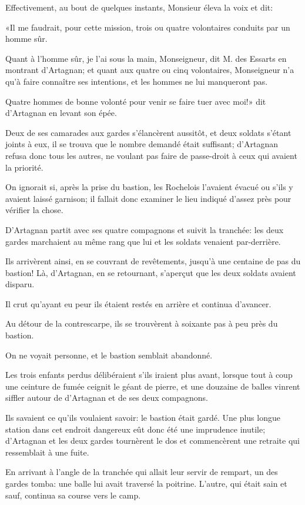 Effectivement, au bout de quelques instants, Monsieur éleva la voix et dit: 

«Il me faudrait, pour cette mission, trois ou quatre volontaires conduits par un homme sûr. 

\speak  Quant à l'homme sûr, je l'ai sous la main, Monseigneur, dit M. des Essarts en montrant d'Artagnan; et quant aux quatre ou cinq volontaires, Monseigneur n'a qu'à faire connaître ses intentions, et les hommes ne lui manqueront pas. 

\speak  Quatre hommes de bonne volonté pour venir se faire tuer avec moi!» dit d'Artagnan en levant son épée. 

Deux de ses camarades aux gardes s'élancèrent aussitôt, et deux soldats s'étant joints à eux, il se trouva que le nombre demandé était suffisant; d'Artagnan refusa donc tous les autres, ne voulant pas faire de passe-droit à ceux qui avaient la priorité. 

On ignorait si, après la prise du bastion, les Rochelois l'avaient évacué ou s'ils y avaient laissé garnison; il fallait donc examiner le lieu indiqué d'assez près pour vérifier la chose. 

D'Artagnan partit avec ses quatre compagnons et suivit la tranchée: les deux gardes marchaient au même rang que lui et les soldats venaient par-derrière. 

Ils arrivèrent ainsi, en se couvrant de revêtements, jusqu'à une centaine de pas du bastion! Là, d'Artagnan, en se retournant, s'aperçut que les deux soldats avaient disparu. 

Il crut qu'ayant eu peur ils étaient restés en arrière et continua d'avancer. 

Au détour de la contrescarpe, ils se trouvèrent à soixante pas à peu près du bastion. 

On ne voyait personne, et le bastion semblait abandonné. 

Les trois enfants perdus délibéraient s'ils iraient plus avant, lorsque tout à coup une ceinture de fumée ceignit le géant de pierre, et une douzaine de balles vinrent siffler autour de d'Artagnan et de ses deux compagnons. 

Ils savaient ce qu'ils voulaient savoir: le bastion était gardé. Une plus longue station dans cet endroit dangereux eût donc été une imprudence inutile; d'Artagnan et les deux gardes tournèrent le dos et commencèrent une retraite qui ressemblait à une fuite. 

En arrivant à l'angle de la tranchée qui allait leur servir de rempart, un des gardes tomba: une balle lui avait traversé la poitrine. L'autre, qui était sain et sauf, continua sa course vers le camp. 

